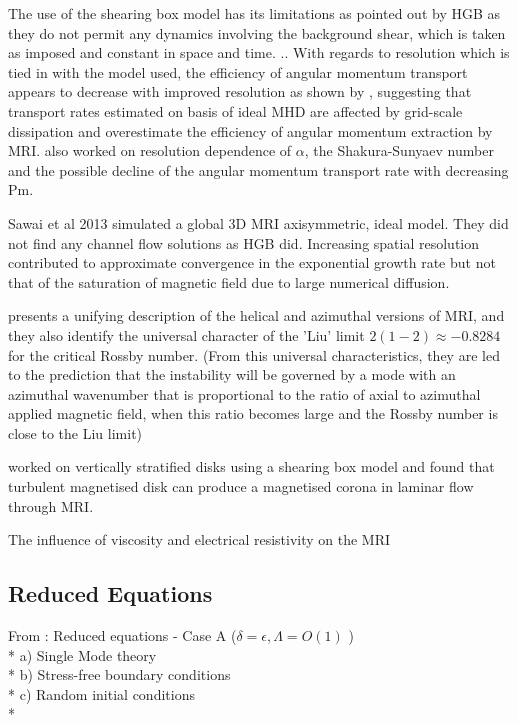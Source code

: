 \documentclass{jfm}
\begin{document}
The use of the shearing box model has its limitations as pointed out by HGB as
they do not permit any dynamics involving the background shear, which is taken
as imposed and constant in space and time. \cite{Regev2008}.. With regards to 
resolution which is tied in with the model used, the efficiency of angular 
momentum transport appears to decrease with improved resolution as shown by 
\cite{Fomang2007}, suggesting that transport rates estimated on basis of ideal
MHD are affected by grid-scale dissipation and overestimate the efficiency of 
angular momentum extraction by MRI. \cite{Kapyla2008} also worked on resolution
dependence of $\alpha$, the Shakura-Sunyaev number and the possible decline of
the angular momentum transport rate with decreasing Pm.

Sawai et al 2013 \cite{Sawai2013} simulated a global 3D MRI axisymmetric, ideal
model. They did not find any channel flow solutions as HGB did. Increasing 
spatial resolution contributed to approximate convergence in the exponential 
growth rate but not that of the saturation of magnetic field due to large 
numerical diffusion.

\cite{Kirillov2012} presents a unifying description of the helical and 
azimuthal versions of MRI, and they also identify the universal character of
the 'Liu' limit $2(1 - 2) \approx - 0.8284$ for the critical Rossby number. 
(From this universal characteristics, they are led to the prediction that the
instability will be governed by a mode with an azimuthal wavenumber that is 
proportional to the ratio of axial to azimuthal applied magnetic field, when
this ratio becomes large and the Rossby number is close to the Liu limit)

\cite{Miller1999} worked on vertically stratified disks using a shearing box
model and found that turbulent magnetised disk can produce a magnetised corona
in laminar flow through MRI.

The influence of viscosity and electrical resistivity on the MRI 
\citep[see][]{Pessah2008}

\subsection{Reduced Equations}
From \cite{Julien2010}: Reduced equations - Case A ($ \delta = \epsilon, \Lambda = O(1) $ ) \\*
 a) Single Mode theory \\*
 b) Stress-free boundary conditions \\*
 c) Random initial conditions \\*
 
\end{document}
